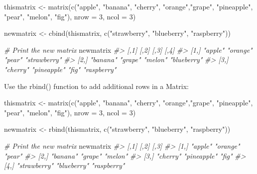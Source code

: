 \documentclass[
]{book}
\newenvironment{Shaded}{\begin{snugshade}}{\end{snugshade}}
\newcommand{\AttributeTok}[1]{\textcolor[rgb]{0.77,0.63,0.00}{#1}}
\newcommand{\CommentTok}[1]{\textcolor[rgb]{0.56,0.35,0.01}{\textit{#1}}}
\newcommand{\DecValTok}[1]{\textcolor[rgb]{0.00,0.00,0.81}{#1}}
\newcommand{\FunctionTok}[1]{\textcolor[rgb]{0.00,0.00,0.00}{#1}}
\newcommand{\NormalTok}[1]{#1}
\newcommand{\OtherTok}[1]{\textcolor[rgb]{0.56,0.35,0.01}{#1}}
\newcommand{\StringTok}[1]{\textcolor[rgb]{0.31,0.60,0.02}{#1}}
\begin{document}
\begin{Shaded}
\begin{Highlighting}[]
\NormalTok{thismatrix }\OtherTok{\textless{}{-}} \FunctionTok{matrix}\NormalTok{(}\FunctionTok{c}\NormalTok{(}\StringTok{"apple"}\NormalTok{, }\StringTok{"banana"}\NormalTok{, }\StringTok{"cherry"}\NormalTok{, }\StringTok{"orange"}\NormalTok{,}\StringTok{"grape"}\NormalTok{, }\StringTok{"pineapple"}\NormalTok{, }\StringTok{"pear"}\NormalTok{, }\StringTok{"melon"}\NormalTok{, }\StringTok{"fig"}\NormalTok{), }\AttributeTok{nrow =} \DecValTok{3}\NormalTok{, }\AttributeTok{ncol =} \DecValTok{3}\NormalTok{)}

\NormalTok{newmatrix }\OtherTok{\textless{}{-}} \FunctionTok{cbind}\NormalTok{(thismatrix, }\FunctionTok{c}\NormalTok{(}\StringTok{"strawberry"}\NormalTok{, }\StringTok{"blueberry"}\NormalTok{, }\StringTok{"raspberry"}\NormalTok{))}

\CommentTok{\# Print the new matrix}
\NormalTok{newmatrix}
\CommentTok{\#\textgreater{}      [,1]     [,2]        [,3]    [,4]        }
\CommentTok{\#\textgreater{} [1,] "apple"  "orange"    "pear"  "strawberry"}
\CommentTok{\#\textgreater{} [2,] "banana" "grape"     "melon" "blueberry" }
\CommentTok{\#\textgreater{} [3,] "cherry" "pineapple" "fig"   "raspberry"}
\end{Highlighting}
\end{Shaded}

Use the rbind() function to add additional rows in a Matrix:

\begin{Shaded}
\begin{Highlighting}[]
\NormalTok{thismatrix }\OtherTok{\textless{}{-}} \FunctionTok{matrix}\NormalTok{(}\FunctionTok{c}\NormalTok{(}\StringTok{"apple"}\NormalTok{, }\StringTok{"banana"}\NormalTok{, }\StringTok{"cherry"}\NormalTok{, }\StringTok{"orange"}\NormalTok{,}\StringTok{"grape"}\NormalTok{, }\StringTok{"pineapple"}\NormalTok{, }\StringTok{"pear"}\NormalTok{, }\StringTok{"melon"}\NormalTok{, }\StringTok{"fig"}\NormalTok{), }\AttributeTok{nrow =} \DecValTok{3}\NormalTok{, }\AttributeTok{ncol =} \DecValTok{3}\NormalTok{)}

\NormalTok{newmatrix }\OtherTok{\textless{}{-}} \FunctionTok{rbind}\NormalTok{(thismatrix, }\FunctionTok{c}\NormalTok{(}\StringTok{"strawberry"}\NormalTok{, }\StringTok{"blueberry"}\NormalTok{, }\StringTok{"raspberry"}\NormalTok{))}

\CommentTok{\# Print the new matrix}
\NormalTok{newmatrix}
\CommentTok{\#\textgreater{}      [,1]         [,2]        [,3]       }
\CommentTok{\#\textgreater{} [1,] "apple"      "orange"    "pear"     }
\CommentTok{\#\textgreater{} [2,] "banana"     "grape"     "melon"    }
\CommentTok{\#\textgreater{} [3,] "cherry"     "pineapple" "fig"      }
\CommentTok{\#\textgreater{} [4,] "strawberry" "blueberry" "raspberry"}
\end{Highlighting}
\end{Shaded}
\end{document}
